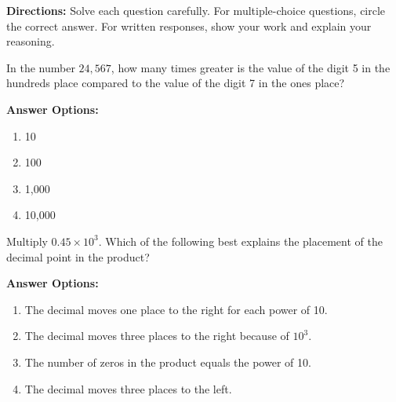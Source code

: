 \documentclass[12pt]{article}
\begin{document}

\begin{tcolorbox}[colframe=black!50, colback=white, title=Assessment Directions]
\textbf{Directions:} Solve each question carefully. For multiple-choice questions, circle the correct answer. For written responses, show your work and explain your reasoning.
\end{tcolorbox}

\begin{tcolorbox}[colframe=black!50, colback=white, title=\textbf{Problem 1}]
In the number \(24,567\), how many times greater is the value of the digit 5 in the hundreds place compared to the value of the digit 7 in the ones place?

\textbf{Answer Options:}
\begin{enumerate}[label=(\Alph*), itemsep=0.5cm]
    \item 10
    \item 100
    \item 1,000
    \item 10,000
\end{enumerate}

\vspace{2cm}
\end{tcolorbox}

\begin{tcolorbox}[colframe=black!50, colback=white, title=\textbf{Problem 2}]
Multiply \(0.45 \times 10^3\). Which of the following best explains the placement of the decimal point in the product?  

\textbf{Answer Options:}
\begin{enumerate}[label=(\Alph*), itemsep=0.5cm]
    \item The decimal moves one place to the right for each power of 10.
    \item The decimal moves three places to the right because of \(10^3\).
    \item The number of zeros in the product equals the power of 10.
    \item The decimal moves three places to the left.
\end{enumerate}

\vspace{1cm}
\end{tcolorbox}
\end{document}
